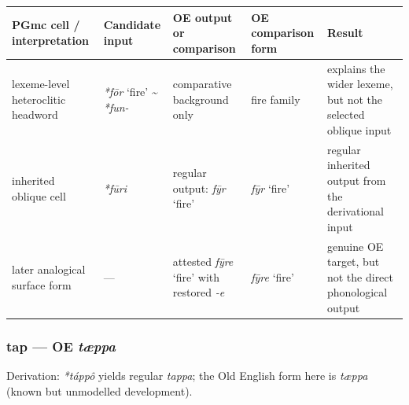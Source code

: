 \documentclass[
  british,
  a4paper,
]{article}
\newcounter{none} %
\providecommand{\Recon}[1]{\emph{*#1}}
\begin{document}
{\def\LTcaptype{none} %
\begin{longtable}[]{@{}
  >{\raggedright\arraybackslash}p{}
  >{\raggedright\arraybackslash}p{}
  >{\raggedright\arraybackslash}p{}
  >{\raggedright\arraybackslash}p{}
  >{\raggedright\arraybackslash}p{}@{}}
\toprule\noalign{}
\begin{minipage}[b]{\linewidth}\raggedright
PGmc cell / interpretation
\end{minipage} & \begin{minipage}[b]{\linewidth}\raggedright
Candidate input
\end{minipage} & \begin{minipage}[b]{\linewidth}\raggedright
OE output or comparison
\end{minipage} & \begin{minipage}[b]{\linewidth}\raggedright
OE comparison form
\end{minipage} & \begin{minipage}[b]{\linewidth}\raggedright
Result
\end{minipage} \\
\midrule\noalign{}
\endhead
\bottomrule\noalign{}
\endlastfoot
lexeme-level heteroclitic headword & \Recon{fōr} `fire'
\textasciitilde{} \emph{*fun-} & comparative background only & fire
family & explains the wider lexeme, but not the selected oblique
input \\
inherited oblique cell & {\emph{*fūri}} & regular output: {\emph{fȳr}}
`fire' & {\emph{fȳr}} `fire' & regular inherited output from the
derivational input \\
later analogical surface form & --- & attested {\emph{fȳre}} `fire' with
restored \emph{-e} & {\emph{fȳre}} `fire' & genuine OE target, but not
the direct phonological output \\
\end{longtable}
}

\subsubsection{\texorpdfstring{tap --- OE
\emph{tæppa}}{tap --- OE tæppa}}\label{tap-oe-tuxe6ppa}

Derivation: \emph{*táppô} yields regular \emph{tappa}; the Old English
form here is \emph{tæppa} (known but unmodelled development).
\end{document}
